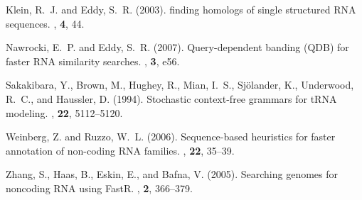 \documentclass{bioinfo}
\begin{document}
\begin{application}
\begin{thebibliography}{}
Klein, R.~J. and Eddy, S.~R. (2003).
 finding homologs of single structured {RNA} sequences.
, {\bf 4}, 44.

Nawrocki, E.~P. and Eddy, S.~R. (2007).
\newblock Query-dependent banding ({QDB}) for faster {RNA} similarity searches.
, {\bf 3}, e56.

Sakakibara, Y., Brown, M., Hughey, R., Mian, I.~S., Sj{\"{o}}lander, K.,
  Underwood, R.~C., and Haussler, D. (1994).
\newblock Stochastic context-free grammars for {tRNA} modeling.
, {\bf 22}, 5112--5120.

Weinberg, Z. and Ruzzo, W.~L. (2006).
\newblock Sequence-based heuristics for faster annotation of non-coding {RNA}
  families.
, {\bf 22}, 35--39.

Zhang, S., Haas, B., Eskin, E., and Bafna, V. (2005).
\newblock Searching genomes for noncoding {RNA} using {FastR}.
, {\bf 2}, 366--379.

\end{thebibliography}

\end{application}
\end{document}
